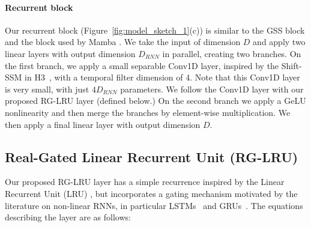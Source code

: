 \documentclass[11pt, a4paper, logo, onecolumn]{googledeepmind}
\theoremstyle{definition}
\newcommand{\subblock}[0]{{block}}
\begin{document}
\paragraph{Recurrent \subblock{}}
\label{sec:recurrent_block}
Our recurrent \subblock{}  (Figure~\ref{fig:model_sketch_1}(c))  is similar to the GSS block \citep{mehta2022long} and the block used by Mamba \citep{gu2023mamba}.
We take the input of dimension $D$ and apply two linear layers with output dimension $D_{RNN}$ in parallel, creating two branches.
On the first branch, we apply a small separable Conv1D layer, inspired by the Shift-SSM in H3~\citep{dao2022hungry}, with a temporal filter dimension of 4.
Note that this Conv1D layer is very small, with just $4D_{RNN}$ parameters. 
We follow the Conv1D layer with our proposed RG-LRU layer (defined below.) %
On the second branch we apply a GeLU nonlinearity and then merge the branches by element-wise multiplication. 
We then apply a final linear layer with output dimension $D$. 














\subsection{Real-Gated Linear Recurrent Unit (RG-LRU)}
\label{sec:RGLRU}
Our proposed RG-LRU layer has a simple recurrence inspired by the Linear Recurrent Unit (LRU) \citep{orvieto2023resurrecting}, but incorporates a gating mechanism motivated by the literature on non-linear RNNs, in particular LSTMs~\citep{hochreiter1997long} and GRUs~\citep{chung2014empirical}.
The equations describing the layer are as follows:
\end{document}
